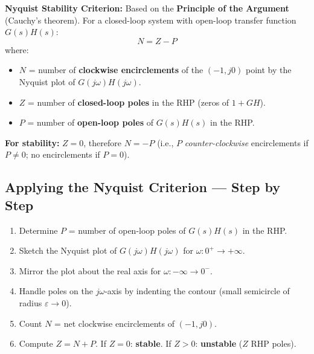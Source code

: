 \documentclass[12pt,a4paper]{article}
\begin{document}
\begin{tcolorbox}[masonbox]
\textbf{Nyquist Stability Criterion:} Based on the \textbf{Principle of the Argument} (Cauchy's theorem). For a closed-loop system with open-loop transfer function $G(s)H(s)$:
$$N = Z - P$$
where:
\begin{itemize}[leftmargin=*, itemsep=2pt, topsep=2pt]
  \item $N$ = number of \textbf{clockwise encirclements} of the $(-1, j0)$ point by the Nyquist plot of $G(j\omega)H(j\omega)$.
  \item $Z$ = number of \textbf{closed-loop poles} in the RHP (zeros of $1+GH$).
  \item $P$ = number of \textbf{open-loop poles} of $G(s)H(s)$ in the RHP.
\end{itemize}
\textbf{For stability:} $Z = 0$, therefore $N = -P$ (i.e., $P$ \textit{counter-clockwise} encirclements if $P \neq 0$; no encirclements if $P = 0$).
\end{tcolorbox}

\subsection{Applying the Nyquist Criterion --- Step by Step}

\begin{enumerate}[label=\textbf{Step \arabic*:}, leftmargin=2.5cm, itemsep=4pt]
  \item Determine $P$ = number of open-loop poles of $G(s)H(s)$ in the RHP.
  \item Sketch the Nyquist plot of $G(j\omega)H(j\omega)$ for $\omega: 0^+ \to +\infty$.
  \item Mirror the plot about the real axis for $\omega: -\infty \to 0^-$.
  \item Handle poles on the $j\omega$-axis by indenting the contour (small semicircle of radius $\varepsilon\to0$).
  \item Count $N$ = net clockwise encirclements of $(-1, j0)$.
  \item Compute $Z = N + P$. If $Z = 0$: \textbf{stable}. If $Z > 0$: \textbf{unstable} ($Z$ RHP poles).
\end{enumerate}
\end{document}
